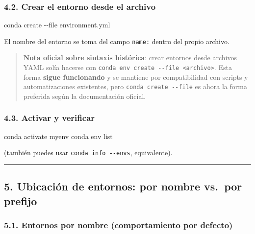 \documentclass[
  doc,
  floatsintext,
  longtable,
  a4paper,
  nolmodern,
  notxfonts,
  notimes,
  12pt,
  colorlinks=true,linkcolor=blue,citecolor=blue,urlcolor=blue]{apa7}
\newenvironment{Shaded}{\begin{snugshade}}{\end{snugshade}}
\newcommand{\AttributeTok}[1]{\textcolor[rgb]{0.40,0.45,0.13}{#1}}
\newcommand{\ExtensionTok}[1]{\textcolor[rgb]{0.00,0.23,0.31}{#1}}
\newcommand{\NormalTok}[1]{\textcolor[rgb]{0.00,0.23,0.31}{#1}}
\begin{document}
\subsubsection{4.2. Crear el entorno desde el
archivo}\label{crear-el-entorno-desde-el-archivo}

\begin{Shaded}
\begin{Highlighting}[]
\ExtensionTok{conda}\NormalTok{ create }\AttributeTok{{-}{-}file}\NormalTok{ environment.yml}
\end{Highlighting}
\end{Shaded}

El nombre del entorno se toma del campo \texttt{name:} dentro del propio
archivo.

\begin{quote}
\textbf{Nota oficial sobre sintaxis histórica}: crear entornos desde
archivos YAML solía hacerse con
\texttt{conda\ env\ create\ -\/-file\ \textless{}archivo\textgreater{}}.
Esta forma \textbf{sigue funcionando} y se mantiene por compatibilidad
con scripts y automatizaciones existentes, pero
\texttt{conda\ create\ -\/-file} es ahora la forma preferida según la
documentación oficial.
\end{quote}

\subsubsection{4.3. Activar y verificar}\label{activar-y-verificar}

\begin{Shaded}
\begin{Highlighting}[]
\ExtensionTok{conda}\NormalTok{ activate myenv}
\ExtensionTok{conda}\NormalTok{ env list}
\end{Highlighting}
\end{Shaded}

(también puedes usar \texttt{conda\ info\ -\/-envs}, equivalente).

\begin{center}\rule{0.5\linewidth}{0.5pt}\end{center}

\subsection{5. Ubicación de entornos: por nombre vs.~por
prefijo}\label{ubicaciuxf3n-de-entornos-por-nombre-vs.-por-prefijo}

\subsubsection{5.1. Entornos por nombre (comportamiento por
defecto)}\label{entornos-por-nombre-comportamiento-por-defecto}
\end{document}

